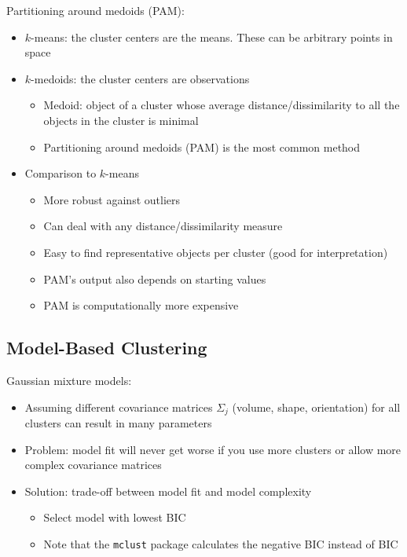 \documentclass[a4paper]{article}
\begin{document}
Partitioning around medoids (PAM):
\begin{itemize}
    \item $k$-means: the cluster centers are the means. These can be arbitrary points in space
    \item $k$-medoids: the cluster centers are observations
    \begin{itemize}
        \item Medoid: object of a cluster whose average distance/dissimilarity to all the objects in the cluster is minimal
        \item Partitioning around medoids (PAM) is the most common method
    \end{itemize}
    \item Comparison to $k$-means
    \begin{itemize}
        \item More robust against outliers
        \item Can deal with any distance/dissimilarity measure
        \item Easy to find representative objects per cluster (good for interpretation)
        \item PAM's output also depends on starting values
        \item PAM is computationally more expensive
    \end{itemize}
\end{itemize}

\subsection{Model-Based Clustering}

Gaussian mixture models:
\begin{itemize}
    \item Assuming different covariance matrices $\Sigma_j$ (volume, shape, orientation) for all clusters can result in many parameters
    \item Problem: model fit will never get worse if you use more clusters or allow more complex covariance matrices
    \item Solution: trade-off between model fit and model complexity
    \begin{itemize}
        \item Select model with lowest BIC
        \item Note that the \texttt{mclust} package calculates the negative BIC instead of BIC
    \end{itemize}
\end{itemize}
\end{document}
